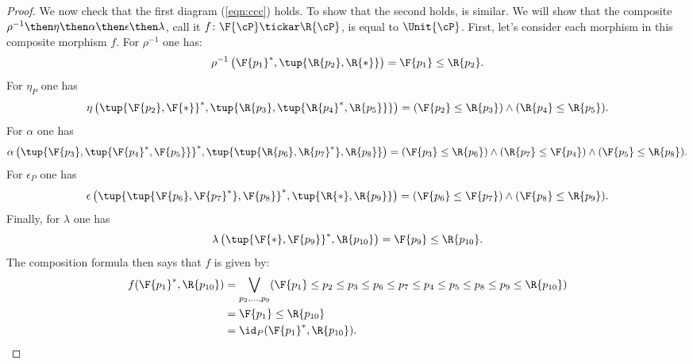\begin{proof}
We now check that the first diagram (\cref{eqn:ccc}) holds. To show that the second holds, is similar. We will show that the composite $\rho^{-1}\then \eta\then \alpha \then \epsilon\then \lambda$, call it $f\colon \F{\cP} \tickar \R{\cP} $, is equal to $\Unit{\cP }$. First, let's consider each morphism in this composite morphism $f$. For $\rho^{-1}$ one has:
\begin{equation}
	\rho^{-1}\left(\F{p_1}^*,\tup{\R{p_2},\R{*}}\right)=\F{p_1}\leq \R{p_2}.
\end{equation}
For $\eta_P$ one has
\begin{equation}
    	\eta\left(\tup{\F{p_2},\F{*}}^*,\tup{\R{p_3},\tup{\R{p_4}^*,\R{p_5}}}\right)=(\F{p_2}\leq \R{p_3})\wedge(\R{p_4}\leq \R{p_5}).
\end{equation}
For $\alpha$ one has
\begin{equation}
    \alpha\left( \tup{\F{p_3},\tup{\F{p_4}^*,\F{p_5}}}^*,\tup{\tup{\R{p_6},\R{p_7}^*},\R{p_8}}\right)=(\F{p_3}\leq \R{p_6})\wedge(\R{p_7}\leq \F{p_4})\wedge(\F{p_5}\leq \R{p_8}).
\end{equation}
For $\epsilon_P$ one has
\begin{equation}
    \epsilon\left(\tup{\tup{\F{p_6},\F{p_7}^*},\F{p_8}}^*,\tup{\R{*},\R{p_9}}\right)=(\F{p_6}\leq \F{p_7})\wedge (\F{p_8}\leq \R{p_9}).
\end{equation}
Finally, for $\lambda$ one has
\begin{equation}
    \lambda\left(\tup{\F{*},\F{p_9}}^*,\R{p_{10}}\right)=\F{p_9}\leq \R{p_{10}}.
\end{equation}
The composition formula then says that $f$ is given by:
\begin{equation}
    \begin{aligned}
    f(\F{p_1}^*,\R{p_{10}})&=\bigvee_{p_2,\ldots,p_9} (\F{p_1}\leq p_2\leq p_3\leq p_6\leq p_7\leq p_4\leq p_5\leq p_8\leq p_9\leq \R{p_{10}})\\
    &=\F{p_1}\leq \R{p_{10}}\\
    &=\id_P(\F{p_1}^*,\R{p_{10}}).
    \end{aligned}
\end{equation}
\end{proof}

